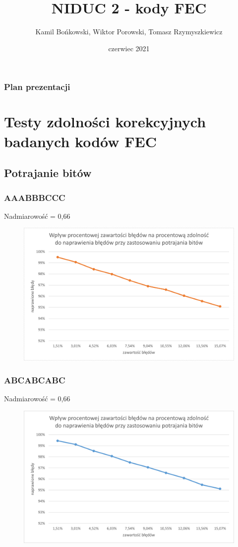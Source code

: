 \documentclass{beamer}
\title[NIDUC 2 - kody FEC]{NIDUC 2 - kody FEC}
\author{Kamil Bońkowski, Wiktor Porowski, Tomasz Rzymyszkiewicz}
\institute[PWr] 
{
Politechnika Wrocławska \\ 
}
\date{czerwiec 2021}
\begin{document}
\begin{frame}
\titlepage
\end{frame}

\begin{frame}
\frametitle{Plan prezentacji}
\tableofcontents 
\end{frame}

\section{Testy zdolności korekcyjnych badanych kodów FEC} 

\subsection{Potrajanie bitów} 

\begin{frame}
\frametitle{AAABBBCCC}

Nadmiarowość = 0,66

\begin{figure}
    \centering
    \includegraphics[scale=0.5]{wykresy/potrajanie_aaa.png}
\end{figure}
\end{frame}


\begin{frame}
\frametitle{ABCABCABC}

Nadmiarowość = 0,66

\begin{figure}
    \centering
    \includegraphics[scale=0.5]{wykresy/potrajanie_abc.png}
\end{figure}

\end{frame}
\end{document}
